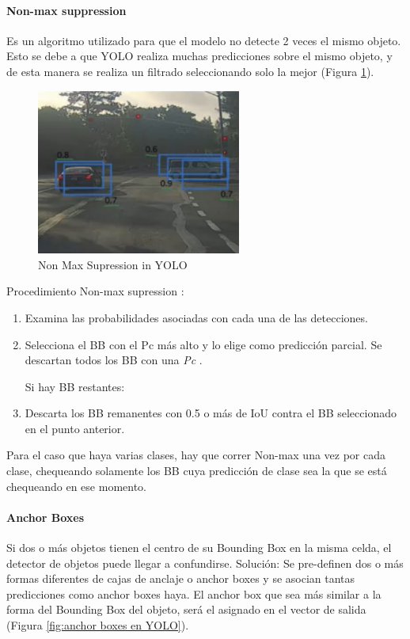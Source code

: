 \paragraph{Non-max suppression}
Es un algoritmo utilizado para que el modelo no detecte 2 veces el mismo objeto. Esto se debe a que YOLO realiza muchas predicciones sobre el mismo objeto, y de esta manera se realiza un filtrado seleccionando solo la mejor (Figura \ref{fig:non max supression}).
\\
\begin{figure}[h]
    \centering
    \includegraphics[width=0.6\textwidth]{img/non-max-supression-yolo.png}
    \caption{Non Max Supression in YOLO}
    \label{fig:non max supression}
\end{figure}

Procedimiento Non-max supression \cite{cnncourse} :
\begin{enumerate}
    \item Examina las probabilidades asociadas con cada una de las detecciones. 
    \item Selecciona el BB con el Pc más alto y lo elige como predicción parcial. Se descartan todos los BB con una \textit{Pc }.

Si hay BB restantes:
    \item Descarta los BB remanentes con 0.5 o más de IoU contra el BB seleccionado en el punto anterior.
\end{enumerate}
Para el caso que haya varias clases, hay que correr Non-max una vez por cada clase, chequeando solamente los BB cuya predicción de clase sea la que se está chequeando en ese momento.

\newpage
\paragraph{Anchor Boxes}
Si dos o más objetos tienen el centro de su Bounding Box en la misma celda, el detector de objetos puede llegar a confundirse. Solución: Se pre-definen dos o más formas diferentes de cajas de anclaje o anchor boxes y se asocian tantas predicciones como anchor boxes haya. El anchor box que sea más similar a la forma del Bounding Box del objeto, será el asignado en el vector de salida \cite{cnncourse} (Figura \ref{fig:anchor boxes en YOLO}).


